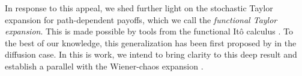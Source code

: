 
 
In response to this appeal, %
we shed further light on the stochastic Taylor expansion for  path-dependent payoffs, which we call the \textit{functional Taylor expansion}. %
This is made possible by 
tools from the functional Itô calculus \cite{Dupire}. To the best of our knowledge, this generalization has been first proposed by \cite{LittererOberhauser} %
in the diffusion case.    
In this is work, we intend to bring  clarity to this deep result and establish a parallel with the Wiener-chaos expansion \cite{DiNunno,Nualart}. 





 
   
 
